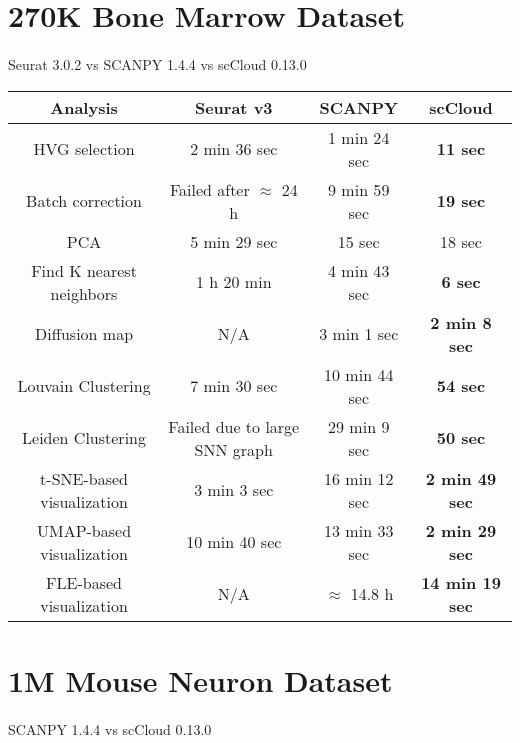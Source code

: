\documentclass[10pt]{article}
\begin{document}
\section{270K Bone Marrow Dataset}

\paragraph{}
Seurat 3.0.2 \qquad vs \qquad SCANPY 1.4.4 \qquad vs \qquad scCloud 0.13.0

\begin{table}[H]
	\centering
	\begin{tabular}{|c|c|c|c|}
		\hline
		Analysis & Seurat v3 & SCANPY & scCloud\\
		\hline \hline
		HVG selection & 2 min 36 sec & 1 min 24 sec & \textbf{11 sec} \\
		\hline
		Batch correction & Failed after $\approx$ 24 h & 9 min 59 sec & \textbf{19 sec} \\
		\hline
		PCA & 5 min 29 sec & 15 sec & 18 sec \\
		\hline
		Find K nearest neighbors &  1 h 20 min &  4 min 43 sec & \textbf{6 sec}\\
		\hline
		Diffusion map & N/A & 3 min 1 sec & \textbf{2 min 8 sec} \\
		\hline
		Louvain Clustering & 7 min 30 sec & 10 min 44 sec & \textbf{54 sec} \\
		\hline 
		Leiden Clustering & Failed due to large SNN graph & 29 min 9 sec & \textbf{50 sec}\\
		\hline
		t-SNE-based visualization & 3 min 3 sec & 16 min 12 sec & \textbf{2 min 49 sec}\\
		\hline
		UMAP-based visualization & 10 min 40 sec & 13 min 33 sec  & \textbf{2 min 29 sec}\\
		\hline
		FLE-based visualization & N/A & $\approx$ 14.8  h & \textbf{14 min 19 sec}\\
		\hline
	\end{tabular}
\end{table}

\section{1M Mouse Neuron Dataset}

\paragraph{}
SCANPY 1.4.4 \qquad vs \qquad scCloud 0.13.0
\end{document}
